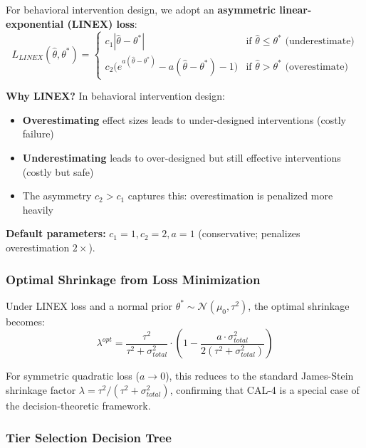 For behavioral intervention design, we adopt an \textbf{asymmetric linear-exponential
(LINEX) loss}:
\begin{equation}
    L_{LINEX}(\hat{\theta}, \theta^*) = \begin{cases}
        c_1 |\hat{\theta} - \theta^*|
            & \text{if } \hat{\theta} \leq \theta^* \text{ (underestimate)} \\
        c_2 \bigl(e^{a(\hat{\theta} - \theta^*)} - a(\hat{\theta} - \theta^*) - 1\bigr)
            & \text{if } \hat{\theta} > \theta^* \text{ (overestimate)}
    \end{cases}
    \label{eq:linex-loss}
\end{equation}

\textbf{Why LINEX?} In behavioral intervention design:
\begin{itemize}[nosep]
    \item \textbf{Overestimating} effect sizes leads to under-designed interventions
          (costly failure)
    \item \textbf{Underestimating} leads to over-designed but still effective
          interventions (costly but safe)
    \item The asymmetry $c_2 > c_1$ captures this: overestimation is penalized more
          heavily
\end{itemize}

\textbf{Default parameters:} $c_1 = 1, c_2 = 2, a = 1$ (conservative; penalizes
overestimation $2\times$).

\subsubsection{Optimal Shrinkage from Loss Minimization}
\label{sec:AN-optimal-shrinkage}

Under LINEX loss and a normal prior $\theta^* \sim \mathcal{N}(\mu_0, \tau^2)$,
the optimal shrinkage becomes:
\begin{equation}
    \lambda^{opt} = \frac{\tau^2}{\tau^2 + \sigma^2_{total}} \cdot
    \left(1 - \frac{a \cdot \sigma^2_{total}}{2(\tau^2 + \sigma^2_{total})}\right)
    \label{eq:optimal-shrinkage}
\end{equation}

For symmetric quadratic loss ($a \to 0$), this reduces to the standard James-Stein
shrinkage factor $\lambda = \tau^2 / (\tau^2 + \sigma^2_{total})$, confirming
that CAL-4 is a special case of the decision-theoretic framework.

\subsubsection{Tier Selection Decision Tree}
\label{sec:AN-tier-selection}

